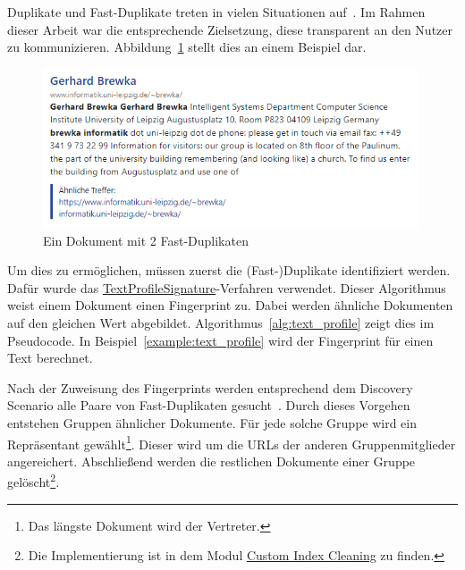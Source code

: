 Duplikate und Fast-Duplikate treten in vielen Situationen auf~\cite{croft.chap3}.
Im Rahmen dieser Arbeit war die entsprechende Zielsetzung, diese transparent an den Nutzer zu kommunizieren.
Abbildung~\ref{fig:grouped_sim} stellt dies an einem Beispiel dar.

\begin{figure}[!ht]
	\includegraphics[width=0.99\textwidth]{chapter_data_aqcuisition/grouped_duplicates.png}
	\caption{Ein Dokument mit 2 Fast-Duplikaten}
	\label{fig:grouped_sim}
\end{figure}



Um dies zu ermöglichen, müssen zuerst die (Fast-)Duplikate identifiziert werden.
Dafür wurde das
\href{https://github.com/apache/nutch/blob/master/src/java/org/apache/nutch/crawl/TextProfileSignature.java}{TextProfileSignature}-Verfahren verwendet.
Dieser Algorithmus weist einem Dokument einen Fingerprint zu.
Dabei werden ähnliche Dokumenten auf den gleichen Wert abgebildet.
Algorithmus~\ref{alg:text_profile} zeigt dies im Pseudocode.
In Beispiel~\ref{example:text_profile} wird der Fingerprint für einen Text berechnet.

Nach der Zuweisung des Fingerprints werden entsprechend dem Discovery Scenario alle Paare von Fast-Duplikaten
gesucht~\cite{croft.chap3}. Durch dieses Vorgehen entstehen Gruppen ähnlicher Dokumente.
Für jede solche Gruppe wird ein Repräsentant gewählt\footnote{Das längste Dokument wird der Vertreter.}.
Dieser wird um die URLs der anderen Gruppenmitglieder angereichert.
Abschließend werden die restlichen Dokumente einer Gruppe gelöscht\footnote{Die Implementierung ist in dem Modul 
\href{https://github.com/mam10eks/search-homepage-of-university-leipzig/tree/master/custom-index-cleaning}
{Custom Index Cleaning} zu finden.}.

\newpage

